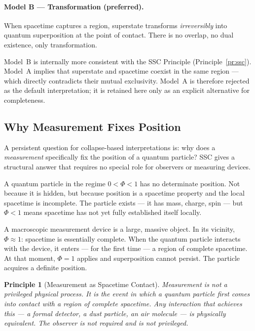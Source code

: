 \documentclass[12pt,a4paper]{article}
\newtheorem{principle}{Principle}
\begin{document}
\paragraph{Model B — Transformation (preferred).}
When spacetime captures a region, superstate transforms
\emph{irreversibly} into quantum superposition at the point of contact.
There is no overlap, no dual existence, only transformation.

Model~B is internally more consistent with the SSC Principle
(Principle~\ref{pr:ssc}).  Model~A implies that superstate and
spacetime coexist in the same region — which directly contradicts
their mutual exclusivity.  Model~A is therefore rejected as the
default interpretation; it is retained here only as an explicit
alternative for completeness.

\subsection{Why Measurement Fixes Position}
\label{sec:measurement}

A persistent question for collapse-based interpretations is: why does
a \emph{measurement} specifically fix the position of a quantum particle?
SSC gives a structural answer that requires no special role for
observers or measuring devices.

A quantum particle in the regime $0 < \Phi < 1$ has no determinate
position.  Not because it is hidden, but because position is a spacetime
property and the local spacetime is incomplete.  The particle exists — it
has mass, charge, spin — but $\Phi < 1$ means spacetime has not yet fully
established itself locally.

A macroscopic measurement device is a large, massive object.  In its
vicinity, $\Phi \approx 1$: spacetime is essentially complete.  When the
quantum particle interacts with the device, it enters — for the first time
— a region of complete spacetime.  At that moment, $\Phi = 1$ applies and
superposition cannot persist.  The particle acquires a definite position.

\begin{principle}[Measurement as Spacetime Contact]
\label{pr:measurement}
Measurement is not a privileged physical process.  It is the event in
which a quantum particle first comes into contact with a region of
complete spacetime.  Any interaction that achieves this — a formal
detector, a dust particle, an air molecule — is physically equivalent.
The observer is not required and is not privileged.
\end{principle}
\end{document}
